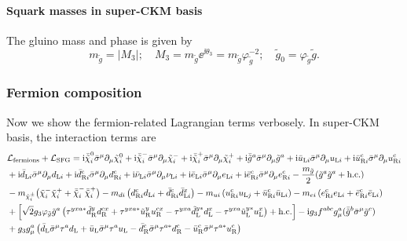 \documentclass[CheatSheet]{subfiles}
\begin{document}
\paragraph{Squark masses in super-CKM basis}
The gluino mass and phase is given by
\begin{equation}
 m_{\tilde g} = |M_3|;
 \quad
 M_3=m_{\tilde g}\ee^{\ii\theta_3} = m_{\tilde g}\varphi_{\tilde g}^{-2};\quad
 \tilde g_0 = \varphi_{\tilde g}\tilde g.
\end{equation}


\subsubsection{Fermion composition}
Now we show the fermion-related Lagrangian terms verbosely. In super-CKM basis, the interaction terms are
\begin{equation}
  \begin{split}
&  \mathcal L\w{fermions} + \mathcal L\w{SFG}
=
   {\ii} \bneut[i]\bsigma^{\mu }\partial_{\mu}\neut[i]
 + {\ii} \bcharM[i]\bsigma^{\mu }\partial_{\mu}\charM[i]
 + {\ii} \bcharP[i]\bsigma^{\mu }\partial_{\mu}\charP[i]
 + {\ii} \bar{\tig}^{a}\bsigma^{\mu }\partial_{\mu}\tig^{a}
 + {\ii} \buL[i]\bsigma^{\mu}\partial_{\mu}\uL[i]
 + {\ii} \buR[i]^{\cc}\bsigma^{\mu }\partial_{\mu}\uR[i]^{\cc}
\\&
 + {\ii} \bdL[i]\bsigma^{\mu}\partial_{\mu}\dL[i]
 + {\ii} \bdR[i]^{\cc}\bsigma^{\mu }\partial_{\mu}\dR[i]^{\cc}
 + {\ii} \bnuL[i]\bsigma^{\mu }\partial_{\mu}\nuL[i]
 + {\ii} \beL[i]\bsigma^{\mu }\partial_{\mu}\eL[i]
 + {\ii} \beR[i]^{\cc}\bsigma^{\mu }\partial_{\mu}\eR[i]^{\cc}
 - \frac{m_{\tilde g}}{2} (\tig^{a}\tig^{a}+\text{h.c.})
\\&
 - m_{\charPM[i]}\bigl(\charM[i]\charP[i] + \bcharM[i]\bcharP[i]\bigr)
 - m_{di}\left(\dR[i]^{\cc}\dL[i] + \bdR[i]^{\cc}\bdL[i]^{x}\right)
 - m_{ui}\left(\uR[i]^{\cc}\uL[j]+\buR[i]^{\cc}\buL[i]\right)
 - m_{ei}\left(\eR[i]^{\cc}\eL[i] + \beR[i]^{\cc}\beL[i]\right)
%
%
\\&+\Bigl[
\sqrt{2} g_3 \varphi_{\tilde g}\tig^{a}\left(
  \tau^{yxa*}\tdR^{y}\dR^{\cc x}
 +\tau^{yxa*}\tuR^{y}\uR^{\cc x}
 -\tau^{yxa}\tdL^{y*}\dL^{x}
 -\tau^{yxa}\tuL^{y*}\uL^{x}
\right)+\text{h.c.}\Bigr]
-\ii g_3 f^{abc}g_\mu^a (\bar{\tig}^{b}\bsigma^{\mu }\tig^{c})
\\&
+
g_3g_\mu^a\left(
 \bdL\bsigma^{\mu }\tau^a\dL
+\buL\bsigma^{\mu }\tau^a\uL
-\bdR^{\cc}\bsigma^{\mu }\tau^{a*}\dR^{\cc}
-\buR^{\cc}\bsigma^{\mu }\tau^{a*}\uR^{\cc}
\right)

\end{split}
\end{equation}
\end{document}
